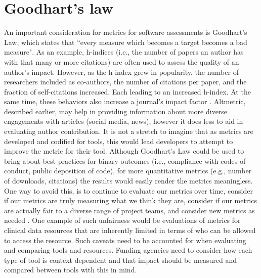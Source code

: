 \documentclass{article}
\begin{document}
\section{Goodhart's law}
An important consideration for metrics for software assessments is Goodhart's Law, which states that “every measure which becomes a target becomes a bad measure\cite{hoskin_awful_1996}". As an example, h-indices (i.e., the number of papers an author has with that many or more citations) are often used to assess the quality of an author’s impact. However, as the h-index grew in popularity, the number of researchers included as co-authors, the number of citations per paper, and the fraction of self-citations increased. Each leading to an increased h-index. At the same time, these behaviors also increase a journal’s impact factor \cite{fire_over-optimization_2019}. Altmetric, described earlier, may help in providing information about more diverse engagements with articles (social media, news), however it does less to aid in evaluating author contribution. It is not a stretch to imagine that as metrics are developed and codified for tools, this would lead developers to attempt to improve the metric for their tool. Although Goodhart’s Law could be used to bring about best practices for binary outcomes (i.e., compliance with codes of conduct, public deposition of code), for more quantitative metrics (e.g., number of downloads, citations) the results would easily render the metrics meaningless. One way to avoid this, is to continue to evaluate our metrics over time, consider if our metrics are truly measuring what we think they are, consider if our metrics are actually fair to a diverse range of project teams, and consider new metrics as needed \cite{fire_over-optimization_2019}. One example of such unfairness would be evaluations of metrics for clinical data resources that are inherently limited in terms of who can be allowed to access the resource. Such caveats need to be accounted for when evaluating and comparing tools and resources. Funding agencies need to consider how each type of tool is context dependent and that impact should be measured and compared between tools with this in mind. 
\end{document}
